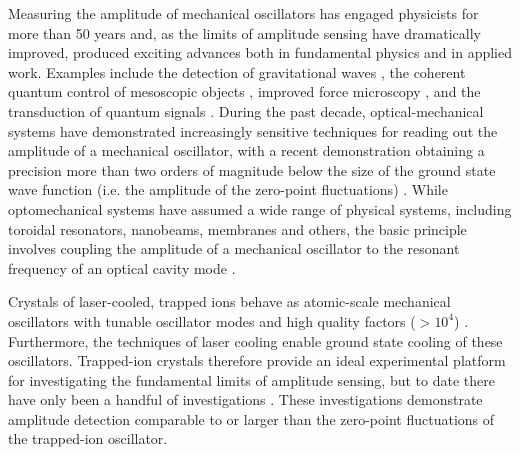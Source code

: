 \documentclass[aps,prl,twocolumn,superscriptaddress,floatfix]{revtex4-1}
\begin{document}
Measuring the amplitude of mechanical oscillators has engaged physicists for more than 50 years \citep{Weber1966} and, as the limits of amplitude sensing have dramatically improved, produced exciting advances both in fundamental physics and in applied work.  Examples include the detection of gravitational waves \citep{Abbott2016}, the coherent quantum control of mesoscopic objects \citep{Aspelmeyer2014}, improved force microscopy \citep{Butt2005}, and the transduction of quantum signals \citep{Palomaki2013}. During the past decade, optical-mechanical systems have demonstrated increasingly sensitive techniques for reading out the amplitude of a mechanical oscillator, with a recent demonstration obtaining a precision more than two orders of magnitude below the size of the ground state wave function (i.e. the amplitude of the zero-point fluctuations) \citep{Wilson2014a}. While optomechanical systems have assumed a wide range of physical systems, including toroidal resonators, nanobeams, membranes and others, the basic principle involves coupling the amplitude of a mechanical oscillator to the resonant frequency of an optical cavity mode \citep{Aspelmeyer2014}.

Crystals of laser-cooled, trapped ions behave as atomic-scale mechanical oscillators \citep{Jost2009,Biercuk2010,Sawyer2012} with tunable oscillator modes and high quality factors ($ > 10^4$) . Furthermore, the techniques of laser cooling enable ground state cooling of these oscillators. Trapped-ion crystals therefore provide an ideal experimental platform for investigating the fundamental limits of amplitude sensing, but to date there have only been a handful of investigations \citep{Biercuk2010,Sawyer2012,Shaniv2016,Knunz2010}. These investigations demonstrate amplitude detection comparable to or larger than the zero-point fluctuations of the trapped-ion oscillator.
\end{document}
